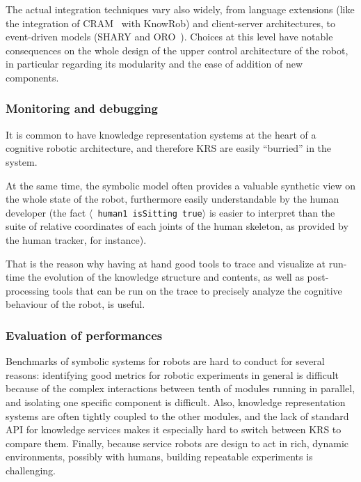 \documentclass[a4paper, twocolumn]{article}
\newcommand{\stmt}[1]{{\footnotesize \tt $\langle$ #1\relax$\rangle$}}
\begin{document}
The actual integration techniques vary also widely, from language extensions
(like the integration of CRAM~\cite{Beetz2010} with KnowRob) and client-server
architectures, to event-driven models (SHARY and ORO~\cite{Alami2011}). Choices
at this level have notable consequences on the whole design of the upper
control architecture of the robot, in particular regarding its modularity and
the ease of addition of new components.

\subsubsection{Monitoring and debugging}
\label{sect|debugging}

It is common to have knowledge representation systems at the heart of a
cognitive robotic architecture, and therefore KRS are easily ``burried'' in the
system.

At the same time, the symbolic model often provides a valuable synthetic view
on the whole state of the robot, furthermore easily understandable by the human
developer (the fact \stmt{human1 isSitting true} is easier to interpret than
the suite of relative coordinates of each joints of the human skeleton, as
provided by the human tracker, for instance).

That is the reason why having at hand good tools to trace and visualize at
run-time the evolution of the knowledge structure and contents, as well as
post-processing tools that can be run on the trace to precisely analyze the
cognitive behaviour of the robot, is useful.

\subsubsection{Evaluation of performances}
\label{sect|performances}


Benchmarks of symbolic systems for robots are hard to conduct for
several reasons: identifying good metrics for robotic experiments in general is
difficult because of the complex interactions between tenth of modules running
in parallel, and isolating one specific component is difficult.
Also, knowledge representation systems are often tightly coupled to
the other modules, and the lack of standard API for knowledge services
makes it especially hard to switch between KRS to compare them. Finally, because
service robots are design to act in rich, dynamic environments, possibly with
humans, building repeatable experiments is challenging.

\begin{scriptsize}
\begin{center}
\end{center}
\end{scriptsize}
\end{document}
